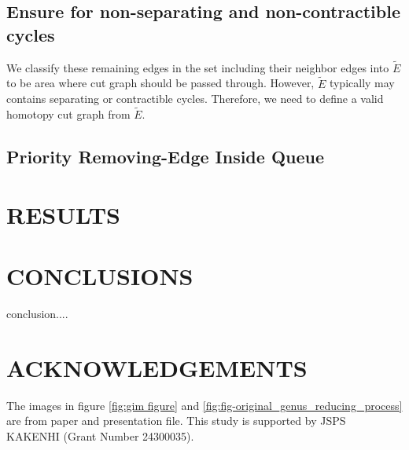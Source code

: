 \documentclass[a4paper,twoside]{article}
\begin{document}
\subsection{Ensure for non-separating and non-contractible cycles}


We classify these remaining edges in the set including their neighbor edges into $\tilde{E}$ to be area where cut graph should be passed through. However, $\tilde{E}$ typically may contains separating or contractible cycles. Therefore, we need to define a valid homotopy cut graph from $\tilde{E}$.
\subsection{Priority Removing-Edge Inside Queue }


\section{\uppercase{Results}}
\label{sec:result}
\section{\uppercase{Conclusions}}
\label{sec:conclusion}

\noindent conclusion....



\section*{\uppercase{Acknowledgements}}
\noindent The images in figure \ref{fig:gim figure} and \ref{fig:fig-original_genus_reducing_process}  are from \cite{Gu:2002:GI:566654.566589} paper and presentation file. This study is supported by JSPS KAKENHI (Grant Number 24300035).


\vfill

{\small
}



\vfill
\end{document}
